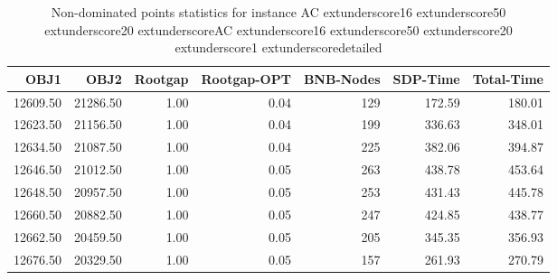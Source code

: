 \begin{table}
\caption{Non-dominated points statistics for instance AC	extunderscore16	extunderscore50	extunderscore20	extunderscoreAC	extunderscore16	extunderscore50	extunderscore20	extunderscore1	extunderscoredetailed}
\label{tab:stats/AC_16_50_20_AC_16_50_20_1_detailed}
\begin{tabular}{rrrrrrr}
\toprule
OBJ1 & OBJ2 & Rootgap & Rootgap-OPT & BNB-Nodes & SDP-Time & Total-Time \\
\midrule
12609.50 & 21286.50 & 1.00 & 0.04 & 129 & 172.59 & 180.01 \\
12623.50 & 21156.50 & 1.00 & 0.04 & 199 & 336.63 & 348.01 \\
12634.50 & 21087.50 & 1.00 & 0.04 & 225 & 382.06 & 394.87 \\
12646.50 & 21012.50 & 1.00 & 0.05 & 263 & 438.78 & 453.64 \\
12648.50 & 20957.50 & 1.00 & 0.05 & 253 & 431.43 & 445.78 \\
12660.50 & 20882.50 & 1.00 & 0.05 & 247 & 424.85 & 438.77 \\
12662.50 & 20459.50 & 1.00 & 0.05 & 205 & 345.35 & 356.93 \\
12676.50 & 20329.50 & 1.00 & 0.05 & 157 & 261.93 & 270.79 \\
\bottomrule
\end{tabular}
\end{table}
